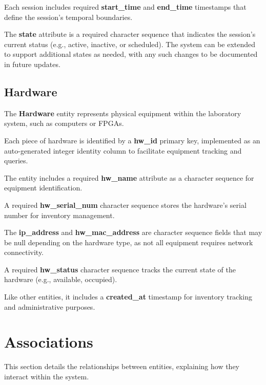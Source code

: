 \documentclass[a4paper,twoside,11pt]{article}
\begin{document}
Each session includes required \textbf{start\_time} and \textbf{end\_time} timestamps that define the session's temporal boundaries.

The \textbf{state} attribute is a required character sequence that indicates the session's current status (e.g., active, inactive, or scheduled). The system can be extended to support additional states as needed, with any such changes to be documented in future updates.

\subsection{Hardware}
The \textbf{Hardware} entity represents physical equipment within the laboratory system, such as computers or FPGAs.

Each piece of hardware is identified by a \textbf{hw\_id} primary key, implemented as an auto-generated integer identity column to facilitate equipment tracking and queries.

The entity includes a required \textbf{hw\_name} attribute as a character sequence for equipment identification.

A required \textbf{hw\_serial\_num} character sequence stores the hardware's serial number for inventory management.

The \textbf{ip\_address} and \textbf{hw\_mac\_address} are character sequence fields that may be null depending on the hardware type, as not all equipment requires network connectivity.

A required \textbf{hw\_status} character sequence tracks the current state of the hardware (e.g., available, occupied).

Like other entities, it includes a \textbf{created\_at} timestamp for inventory tracking and administrative purposes.

\section{Associations}
This section details the relationships between entities, explaining how they interact within the system.
\end{document}

